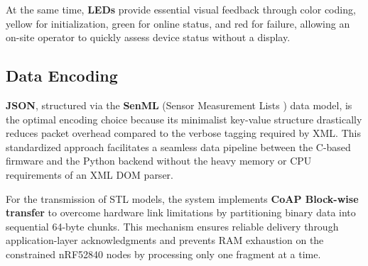 At the same time, \textbf{LEDs} provide essential visual feedback through color coding, yellow for initialization, green for online status, and red for failure, allowing an on-site operator to quickly assess device status without a display. 

\subsection{Data Encoding}
\textbf{JSON}, structured via the \textbf{SenML} (Sensor Measurement Lists \cite{senml}) data model, is the optimal encoding choice because its minimalist key-value structure drastically reduces packet overhead compared to the verbose tagging required by XML. This standardized approach facilitates a seamless data pipeline between the C-based firmware and the Python backend without the heavy memory or CPU requirements of an XML DOM parser.

\medspace 

For the transmission of STL models, the system implements \textbf{CoAP Block-wise transfer} to overcome hardware link limitations by partitioning binary data into sequential 64-byte chunks. This mechanism ensures reliable delivery through application-layer acknowledgments and prevents RAM exhaustion on the constrained nRF52840 nodes by processing only one fragment at a time.

